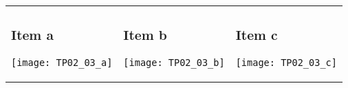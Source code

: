 {\begin{center}
\begin{tabular}{p{48mm} p{48mm} p{48mm}}
	\subsubsection{Item a}
	\begin{center} \texttt{[image: TP02\_03\_a]} \end{center}
	&
	\subsubsection{Item b}
	\begin{center} \texttt{[image: TP02\_03\_b]} \end{center}
	&
	\subsubsection{Item c}
	\begin{center} \texttt{[image: TP02\_03\_c]} \end{center}
\end{tabular}
\end{center}
}
